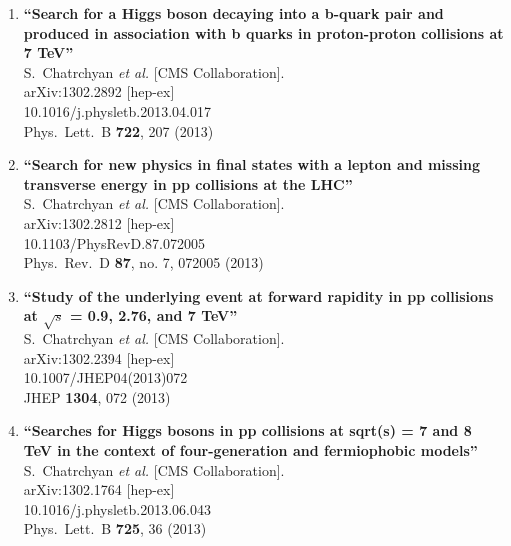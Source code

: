 \documentclass{article}
\begin{document}
\begin{enumerate}
\item%
{\bf ``Search for a Higgs boson decaying into a b-quark pair and produced in association with b quarks in proton-proton collisions at 7 TeV''}
  \\{}S.~Chatrchyan {\it et al.}  [CMS Collaboration].
  \\{}arXiv:1302.2892 [hep-ex]
    \\{}10.1016/j.physletb.2013.04.017
\\{}Phys.\ Lett.\ B {\bf 722}, 207 (2013) %


\item%
{\bf ``Search for new physics in final states with a lepton and missing transverse energy in pp collisions at the LHC''}
  \\{}S.~Chatrchyan {\it et al.}  [CMS Collaboration].
  \\{}arXiv:1302.2812 [hep-ex]
    \\{}10.1103/PhysRevD.87.072005
\\{}Phys.\ Rev.\ D {\bf 87}, no. 7, 072005 (2013) %


\item%
{\bf ``Study of the underlying event at forward rapidity in pp collisions at $\sqrt{s}$ = 0.9, 2.76, and 7 TeV''}
  \\{}S.~Chatrchyan {\it et al.}  [CMS Collaboration].
  \\{}arXiv:1302.2394 [hep-ex]
    \\{}10.1007/JHEP04(2013)072
\\{}JHEP {\bf 1304}, 072 (2013) %


\item%
{\bf ``Searches for Higgs bosons in pp collisions at sqrt(s) = 7 and 8 TeV in the context of four-generation and fermiophobic models''}
  \\{}S.~Chatrchyan {\it et al.}  [CMS Collaboration].
  \\{}arXiv:1302.1764 [hep-ex]
    \\{}10.1016/j.physletb.2013.06.043
\\{}Phys.\ Lett.\ B {\bf 725}, 36 (2013) %



\end{enumerate}
\end{document}

